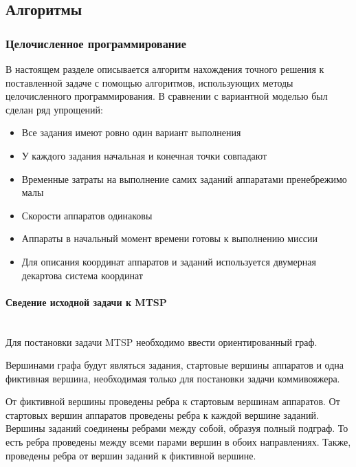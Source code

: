 \documentclass[a4paper,14pt,russian]{article}
\begin{document}
\subsection{Алгоритмы}
\subsubsection{Целочисленное программирование}

В настоящем разделе описывается алгоритм нахождения точного решения к поставленной задаче с помощью алгоритмов, использующих методы целочисленного программирования. В сравнении с вариантной моделью был сделан ряд упрощений:


\begin{itemize}
\item Все задания имеют ровно один вариант выполнения
\item У каждого задания начальная и конечная точки совпадают
\item Временные затраты на выполнение самих заданий аппаратами пренебрежимо малы
\item Скорости аппаратов одинаковы
\item Аппараты в начальный момент времени готовы к выполнению миссии
\item Для описания координат аппаратов и заданий используется двумерная декартова система координат
\end{itemize}


\paragraph{Сведение исходной задачи к MTSP} ~\\

Для постановки задачи MTSP необходимо ввести ориентированный граф.

Вершинами графа будут являться задания, стартовые вершины аппаратов и одна фиктивная вершина, необходимая только для постановки задачи коммивояжера.

От фиктивной вершины проведены ребра к стартовым вершинам аппаратов. От стартовых вершин аппаратов проведены ребра к каждой вершине заданий. Вершины заданий соединены ребрами между собой, образуя полный подграф. То есть ребра проведены между всеми парами вершин в обоих направлениях. Также, проведены ребра от вершин заданий к фиктивной вершине.
\end{document}
